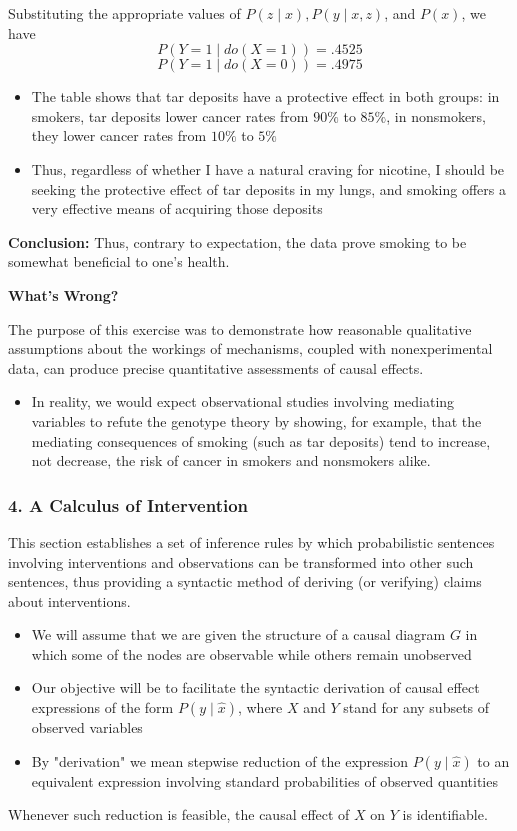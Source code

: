 \documentclass{beamer}
\begin{document}
\begin{frame}
Substituting the appropriate values of $P(z \mid x), P(y \mid x, z)$, and $P(x)$, we have
$$
P(Y=1 \mid d o(X=1))=.4525
$$
$$
P(Y=1 \mid d o(X=0))=.4975
$$
\begin{itemize}
\item The table shows that tar deposits have a protective effect in both groups: in smokers, tar deposits lower cancer rates from $90 \%$ to $85 \%$, in nonsmokers, they lower cancer rates from $10 \%$ to $5 \%$
\item Thus, regardless of whether I have a natural craving for nicotine, I should be seeking the protective effect of tar deposits in my lungs, and smoking offers a very effective means of acquiring those deposits
\end{itemize}

\vspace{0.3cm}
\textbf{Conclusion:} Thus, contrary to expectation, the data prove smoking to be somewhat beneficial to one's health.
\end{frame}

\begin{frame}
\textbf{What's Wrong?}

\vspace{0.3cm}
The purpose of this exercise was to demonstrate how reasonable qualitative assumptions about the workings of mechanisms, coupled with nonexperimental data, can produce precise quantitative assessments of causal effects.

\begin{itemize}
\item In reality, we would expect observational studies involving mediating variables to refute the genotype theory by showing, for example, that the mediating consequences of smoking (such as tar deposits) tend to increase, not decrease, the risk of cancer in smokers and nonsmokers alike.
\end{itemize}
\end{frame}

\begin{frame}
\frametitle{4. A Calculus of Intervention}
This section establishes a set of inference rules by which probabilistic sentences involving interventions and observations can be transformed into other such sentences, thus providing a syntactic method of deriving (or verifying) claims about interventions.
\begin{itemize}
\item We will assume that we are given the structure of a causal diagram $G$ in which some of the nodes are observable while others remain unobserved
\item Our objective will be to facilitate the syntactic derivation of causal effect expressions of the form $P(y \mid \hat{x})$, where $X$ and $Y$ stand for any subsets of observed variables
\item By "derivation" we mean stepwise reduction of the expression $P(y \mid \hat{x})$ to an equivalent expression involving standard probabilities of observed quantities
\end{itemize}
Whenever such reduction is feasible, the causal effect of $X$ on $Y$ is identifiable.
\end{frame}
\end{document}
